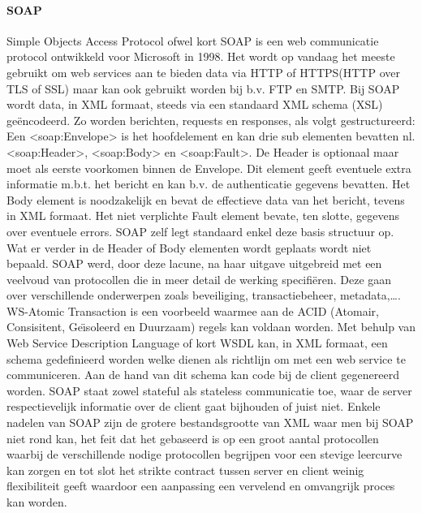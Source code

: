 \paragraph{SOAP}
Simple Objects Access Protocol ofwel kort SOAP is een web communicatie protocol ontwikkeld voor Microsoft in 1998. Het wordt op vandaag het meeste gebruikt om
web services aan te bieden data via HTTP of HTTPS(HTTP over TLS of SSL) maar kan ook gebruikt worden bij b.v. FTP en SMTP.
Bij SOAP wordt data, in XML formaat, steeds via een standaard XML schema (XSL) ge\"encodeerd. Zo worden berichten, requests en responses, als volgt gestructureerd:
Een <soap:Envelope> is het hoofdelement en kan drie sub elementen bevatten nl. <soap:Header>, <soap:Body> en <soap:Fault>. De Header is optionaal maar moet
als eerste voorkomen binnen de Envelope. Dit element geeft eventuele extra informatie m.b.t. het bericht en kan b.v. de authenticatie gegevens bevatten. Het Body element
is noodzakelijk en bevat de effectieve data van het bericht, tevens in XML formaat. Het niet verplichte Fault element bevate, ten slotte, gegevens over eventuele errors.\newline
SOAP zelf legt standaard enkel deze basis structuur op. Wat er verder in de Header of Body elementen wordt geplaats wordt niet bepaald. SOAP werd, door deze lacune, na haar
uitgave uitgebreid met een veelvoud van protocollen die in meer detail de werking specifi\"eren. Deze gaan over verschillende onderwerpen zoals beveiliging, transactiebeheer,
metadata,\ldots. WS-Atomic Transaction is een voorbeeld waarmee aan de ACID (Atomair, Consisitent, Ge\"{\i}soleerd en Duurzaam) regels kan voldaan worden.
Met behulp van Web Service Description Language of kort WSDL kan, in XML formaat, een schema gedefinieerd worden welke dienen als richtlijn om met een web service te
communiceren. Aan de hand van dit schema kan code bij de client gegenereerd worden. SOAP staat zowel stateful als stateless communicatie toe, waar de server respectievelijk
informatie over de client gaat bijhouden of juist niet.\newline
Enkele nadelen van SOAP zijn de grotere bestandsgrootte van XML waar men bij SOAP niet rond kan, het feit dat het gebaseerd is op een groot aantal protocollen waarbij
de verschillende nodige protocollen begrijpen voor een stevige leercurve kan zorgen en tot slot het strikte contract tussen server en client weinig flexibiliteit geeft
waardoor een aanpassing een vervelend en omvangrijk proces kan worden.\newline
~\autocite{soap}\\
~\autocite{redhatapissoaprestgraphqlgrpc}\\

